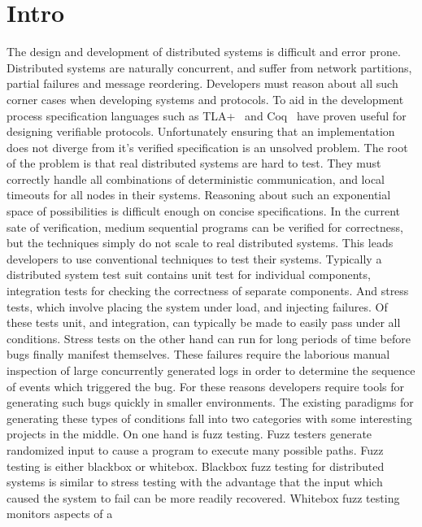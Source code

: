 \section{Intro}
\label{sec:intro}

The design and development of distributed systems is difficult and error prone.
Distributed systems are naturally concurrent, and suffer from network partitions,
partial failures and message reordering. Developers must reason about all such
corner cases when developing systems and protocols. To aid in the development
process specification languages such as TLA+~\cite{} and Coq~\cite{} have
proven useful for designing verifiable protocols. Unfortunately ensuring that an
implementation does not diverge from it's verified specification is an unsolved
problem. The root of the problem is that real distributed systems are hard to
test. They must correctly handle all combinations of deterministic
communication, and local timeouts for all nodes in their systems. Reasoning
about such an exponential space of possibilities is difficult enough on concise
specifications. In the current sate of verification, medium sequential programs
can be verified for correctness, but the techniques simply do not scale to real
distributed systems. This leads developers to use conventional techniques to
test their systems. Typically a distributed system test suit contains unit test
for individual components, integration tests for checking the correctness of
separate components. And stress tests, which involve placing the system under
load, and injecting failures. Of these tests unit, and integration, can
typically be made to easily pass under all conditions. Stress tests on the other
hand can run for long periods of time before bugs finally manifest themselves.
These failures require the laborious manual inspection of large concurrently
generated logs in order to determine the sequence of events which triggered the
bug. For these reasons developers require tools for generating such bugs
quickly in smaller environments. The existing paradigms for generating these
types of conditions fall into two categories with some interesting projects in
the middle. On one hand is fuzz testing. Fuzz testers generate randomized input
to cause a program to execute many possible paths. Fuzz testing is either
blackbox or whitebox. Blackbox fuzz testing for distributed systems is similar
to stress testing with the advantage that the input which caused the system to
fail can be more readily recovered. Whitebox fuzz testing monitors aspects of a
